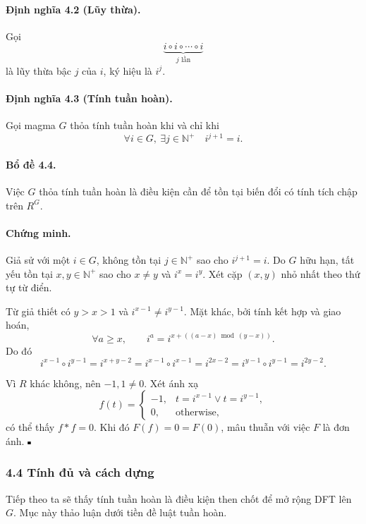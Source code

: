 \documentclass[11pt]{article}
\newcommand{\qedmark}{\hfill\rule{0.7ex}{0.7ex}}
\begin{document}
\paragraph{Định nghĩa 4.2 (Lũy thừa).}
Gọi
\[
  \underbrace{i\circ i\circ\cdots\circ i}_{j\text{ lần}}
\]
là lũy thừa bậc \(j\) của \(i\), ký hiệu là \(i^j\).

\paragraph{Định nghĩa 4.3 (Tính tuần hoàn).}
Gọi magma \(G\) thỏa tính tuần hoàn khi và chỉ khi
\[
  \forall i\in G,\ \exists j\in\mathbb N^+\quad i^{j+1}=i.
\]

\paragraph{Bổ đề 4.4.}
Việc \(G\) thỏa tính tuần hoàn là điều kiện cần để tồn tại biến đổi có tính tích
chập trên \(R^G\).

\paragraph{Chứng minh.}
Giả sử với một \(i\in G\), không tồn tại \(j\in\mathbb N^+\) sao cho
\(i^{j+1}=i\). Do \(G\) hữu hạn, tất yếu tồn tại \(x,y\in\mathbb N^+\) sao cho
\(x\ne y\) và \(i^x=i^y\). Xét cặp \((x,y)\) nhỏ nhất theo thứ tự từ điển.

Từ giả thiết có \(y>x>1\) và \(i^{x-1}\ne i^{y-1}\). Mặt khác, bởi tính kết hợp
và giao hoán,
\[
  \forall a\ge x,\qquad i^a=i^{x+((a-x)\bmod(y-x))}.
\]
Do đó
\[
  i^{x-1}\circ i^{y-1}
  =
  i^{x+y-2}
  =
  i^{x-1}\circ i^{x-1}
  =
  i^{2x-2}
  =
  i^{y-1}\circ i^{y-1}
  =
  i^{2y-2}.
\]

Vì \(R\) khác không, nên \(-1,1\ne0\). Xét ánh xạ
\[
  f(t)=
  \begin{cases}
    -1, & t=i^{x-1}\lor t=i^{y-1},\\
    0, & \text{otherwise},
  \end{cases}
\]
có thể thấy \(f*f=0\). Khi đó \(F(f)=0=F(0)\), mâu thuẫn với việc \(F\) là đơn
ánh. \(\qedmark\)

\subsubsection*{4.4 Tính đủ và cách dựng}

Tiếp theo ta sẽ thấy tính tuần hoàn là điều kiện then chốt để mở rộng DFT lên
\(G\). Mục này thảo luận dưới tiền đề luật tuần hoàn.
\end{document}
